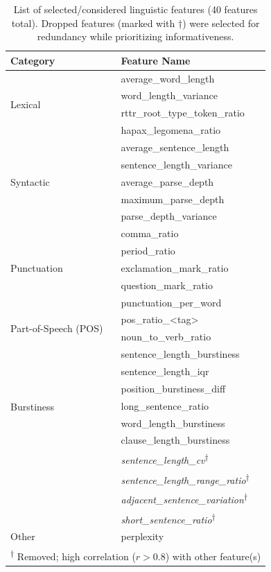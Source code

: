 \documentclass[11pt]{article}
\begin{document}
\begin{table}[t]
  \centering
  \caption{List of selected/considered linguistic features (40 features total). Dropped features (marked with †) were selected for redundancy while prioritizing informativeness.}
  \footnotesize
  \begin{tabular*}{\columnwidth}{@{\extracolsep{\fill}}ll}
  \toprule
  \textbf{Category} & \textbf{Feature Name} \\
  \midrule
  \multirow{4}{*}{Lexical}
   & average\_word\_length \\
   & word\_length\_variance \\
   & rttr\_root\_type\_token\_ratio \\
   & hapax\_legomena\_ratio \\
  \midrule
  \multirow{5}{*}{Syntactic}
   & average\_sentence\_length \\
   & sentence\_length\_variance \\
   & average\_parse\_depth \\
   & maximum\_parse\_depth \\
   & parse\_depth\_variance \\
  \midrule
  \multirow{5}{*}{Punctuation}
   & comma\_ratio \\
   & period\_ratio \\
   & exclamation\_mark\_ratio \\
   & question\_mark\_ratio \\
   & punctuation\_per\_word \\
  \midrule
  \multirow{2}{*}{Part-of-Speech (POS)}
   & pos\_ratio\_<tag> \\
   & noun\_to\_verb\_ratio \\
  \midrule
  \multirow{7}{*}{Burstiness}
   & sentence\_length\_burstiness \\
   & sentence\_length\_iqr \\
   & position\_burstiness\_diff \\
   & long\_sentence\_ratio \\
   & word\_length\_burstiness \\
   & clause\_length\_burstiness \\
   & \textit{sentence\_length\_cv}\textsuperscript{†} \\
   & \textit{sentence\_length\_range\_ratio}\textsuperscript{†} \\
   & \textit{adjacent\_sentence\_variation}\textsuperscript{†} \\
   & \textit{short\_sentence\_ratio}\textsuperscript{†} \\
  \midrule
  Other & perplexity \\
  \bottomrule
  \multicolumn{2}{l}{\footnotesize\textsuperscript{†} Removed; high correlation ($r>0.8$) with other feature(s)}
  \end{tabular*}
  \label{tab:feature-selection}
  \end{table}
\end{document}
